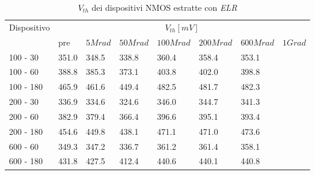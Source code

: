\documentclass[12pt, letterpaper]{book}
\begin{document}
\begin{table}[H]
  \renewcommand{\arraystretch}{1.3}
  \begin{tabular}{m{2cm} m{0.8cm} m{1.1cm} m{1.3cm} m{1.5cm} m{1.5cm} m{1.5cm} m{1cm}}
    \toprule
    \multirow{2}{*}{Dispositivo} & \multicolumn{7}{c}{$V_{th} [mV] $}                                                                    \\
    \cmidrule{2-8}
                                 & pre                                & $5Mrad$ & $50Mrad$ & $100Mrad$ & $200Mrad$ & $600Mrad$ & $1Grad$ \\
    \midrule
    100 - 30                     & 351.0                              & 348.5   & 338.8    & 360.4     & 358.4     & 353.1    &         \\
    \hline
    100 - 60                     & 388.8                              & 385.3   & 373.1    & 403.8     & 402.0     & 398.8    &         \\
    \hline
    100 - 180                    & 465.9                              & 461.6   & 449.4    & 482.5     & 481.7     & 482.3    &         \\
    \hline
    200 - 30                     & 336.9                              & 334.6   & 324.6    & 346.0     & 344.7     & 341.3    &         \\
    \hline
    200 - 60                     & 382.9                              & 379.4   & 366.4    & 396.6     & 395.1     & 393.4    &         \\
    \hline
    200 - 180                    & 454.6                              & 449.8   & 438.1    & 471.1     & 471.0     & 473.6    &         \\
    \hline
    600 - 60                     & 349.3                              & 347.2   & 336.7    & 361.2     & 361.4     & 358.1    &         \\
    \hline
    600 - 180                    & 431.8                              & 427.5   & 412.4    & 440.6     & 440.1     & 440.8    &         \\
    \bottomrule
  \end{tabular}
  \caption{$V_{th}$ dei dispositivi NMOS estratte con \emph{ELR}}
  \label{tab:VthELRN}
\end{table}
\end{document}
